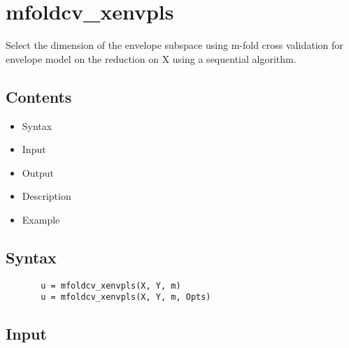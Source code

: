 \documentclass[a4paper,11pt,openany]{memoir}
\begin{document}
\newpage
\rmfamily
\color{black}\section{mfoldcv\_xenvpls}

\begin{par}
Select the dimension of the envelope subspace using m-fold cross validation for envelope model on the reduction on X using a sequential algorithm.
\end{par} \vspace{1em}

\subsection*{Contents}

\begin{itemize}
\setlength{\itemsep}{-1ex}
   \item Syntax
   \item Input
   \item Output
   \item Description
   \item Example
\end{itemize}


\subsection*{Syntax}


\begin{verbatim}       u = mfoldcv_xenvpls(X, Y, m)
       u = mfoldcv_xenvpls(X, Y, m, Opts)\end{verbatim}
    

\subsection*{Input}
\end{document}
